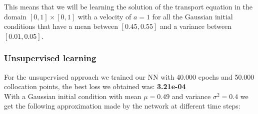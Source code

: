 \documentclass{article}
\begin{document}
This means that we will be learning the solution of the transport equation in the domain $[0,1] \times [0,1]$ with a velocity of $a=1$ for all the Gaussian initial conditions that have a mean between $[0.45,0.55]$ and a variance between $[0.01,0.05]$.

\subsubsection{Unsupervised learning}

For the unsupervised approach we trained our NN with 40.000 epochs and 50.000 collocation points, the best loss we obtained was: \textbf{3.21e-04} \\

With a Gaussian initial condition with mean $\mu = 0.49$ and variance $\sigma^2 = 0.4$ we get the following approximation made by the network at different time steps:\\
\end{document}
